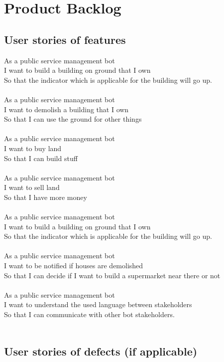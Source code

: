 \section{Product Backlog}
\subsection{User stories of features}

As a public service management bot\\
I want to build a building on ground that I own\\
So that the indicator which is applicable for the building will go up.\\
\\
As a public service management bot\\
I want to demolish a building that I own\\
So that I can use the ground for other things\\
\\
As a public service management bot\\
I want to buy land\\
So that I can build stuff\\
\\
As a public service management bot\\
I want to sell land\\
So that I have more money\\
\\
As a public service management bot\\
I want to build a building on ground that I own\\
So that the indicator which is applicable for the building will go up.\\
\\
As a public service management bot\\
I want to be notified if houses are demolished\\
So that I can decide if I want to build a supermarket near there or not\\
\\
As a public service management bot\\
I want to understand the used language between stakeholders\\
So that I can communicate with other bot stakeholders.\\
\\

\subsection{User stories of defects (if applicable)}

